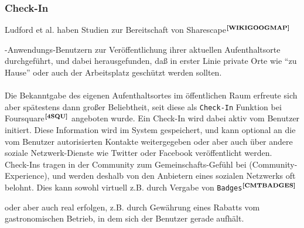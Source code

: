 \subsubsection{Check-In}
Ludford et al. haben Studien zur Bereitschaft von Sharescape$^{\textbf{\ref{WIKIGOOGMAP}}}$%
\addtocounter{footnote}{1}%
-Anwendungs-Benutzern zur Veröffentlichung ihrer aktuellen Aufenthaltsorte durchgeführt, und dabei herausgefunden, daß in erster Linie private Orte wie "`zu  Hause"' oder auch der Arbeitsplatz geschützt werden sollten.\cite{LUETAL:CSULPI}\\ \\
Die Bekanntgabe des eigenen Aufenthaltsortes im öffentlichen Raum erfreute sich aber spätestens dann großer Beliebtheit, seit diese als \texttt{Check-In} Funktion bei Foursquare$^{\textbf{\ref{4SQU}}}$ angeboten wurde. Ein Check-In wird dabei aktiv vom Benutzer initiert. Diese Information
wird im System gespeichert, und kann optional an die vom Benutzer autorisierten Kontakte weitergegeben oder aber auch über andere soziale Netzwerk-Dienste wie Twitter oder Facebook veröffentlicht werden.\\
Check-Ins tragen in der Community zum Gemeinschafts-Gefühl bei (Community-Experience), und werden deshalb von den Anbietern eines sozialen Netzwerks oft belohnt. Dies kann sowohl virtuell z.B. durch Vergabe von \texttt{Badges}$^{\textbf{\ref{CMTBADGES}}}$%
\addtocounter{footnote}{1}%
 oder aber auch real erfolgen, z.B. durch Gewährung eines Rabatts vom gastronomischen Betrieb, in dem sich der Benutzer gerade aufhält.
